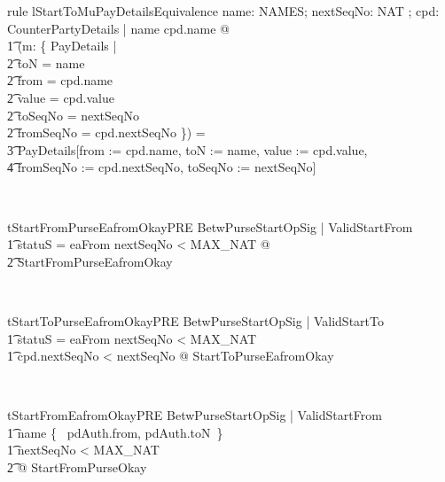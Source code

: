 \begin{LRRT}
\begin{theorem}{rule lStartToMuPayDetailsEquivalence}
   \forall name: NAMES; nextSeqNo: NAT ; cpd: CounterPartyDetails | name \neq cpd.name @ \\
     \t1 (\mu  m: \{  PayDetails | \\
              \t2 toN = name \\
              \t2 \land  from = cpd.name \\
              \t2 \land value = cpd.value \\
              \t2 \land  toSeqNo = nextSeqNo \\
              \t2 \land  fromSeqNo = cpd.nextSeqNo \}) = \\
            \t3 \theta PayDetails[from := cpd.name, toN := name, value := cpd.value, \\
                \t4 fromSeqNo := cpd.nextSeqNo, toSeqNo := nextSeqNo]
\end{theorem}~\end{LRRT}

\begin{LNewThm}
\begin{theorem}{tStartFromPurseEafromOkayPRE}
    \forall  BetwPurseStartOpSig | ValidStartFrom \\
        \t1 \land  statuS = eaFrom \land nextSeqNo < MAX\_NAT @ \\
            \t2 \pre StartFromPurseEafromOkay
\end{theorem}~\end{LNewThm}

\begin{LNewThm}
\begin{theorem}{tStartToPurseEafromOkayPRE}
    \forall  BetwPurseStartOpSig | ValidStartTo \\
        \t1 \land  statuS = eaFrom \land nextSeqNo < MAX\_NAT \\
        \t1 \land cpd.nextSeqNo < nextSeqNo @ \pre StartToPurseEafromOkay
\end{theorem}~\end{LNewThm}

\begin{LNewThm}
\begin{theorem}{tStartFromEafromOkayPRE}
    \forall BetwPurseStartOpSig | ValidStartFrom \\
        \t1 \land name \in \{~ pdAuth.from, pdAuth.toN~\} \\
        \t1 \land nextSeqNo < MAX\_NAT \\
            \t2 @ \pre StartFromPurseOkay
\end{theorem}~\end{LNewThm}

